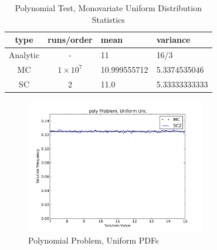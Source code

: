\begin{table}[H]
\begin{center}
\begin{tabular}{c c|l l}
type & runs/order & mean & variance \\ \hline
Analytic & - & 11 & 16/3 \\
MC & $1\times10^7$ & 10.999555712 & 5.3374535046 \\
SC & 2 & 11.0 & 5.33333333333 \\
\end{tabular}
\end{center}
\caption{Polynomial Test, Monovariate Uniform Distribution Statistics}
\label{tab:poly uniform}
\end{table}

\begin{figure}[H]
\centering
   \includegraphics[width=0.7\textwidth]{../graphics/poly_uniform_pdfs}
   \caption{Polynomial Problem, Uniform PDFs}
      \label{fig:poly uni}
\end{figure}


